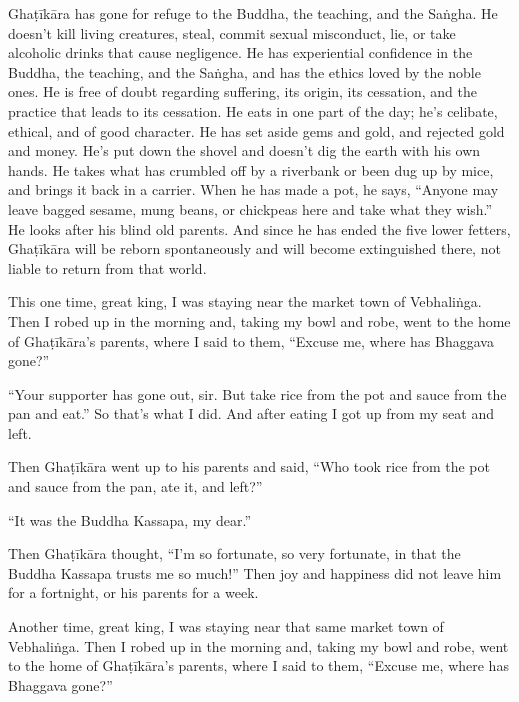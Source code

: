 \documentclass[12pt,openany]{book}%
\begin{document}
\textsanskrit{Ghaṭīkāra} has gone for refuge to the Buddha, the teaching, and the \textsanskrit{Saṅgha}. He doesn’t kill living creatures, steal, commit sexual misconduct, lie, or take alcoholic drinks that cause negligence. He has experiential confidence in the Buddha, the teaching, and the \textsanskrit{Saṅgha}, and has the ethics loved by the noble ones. He is free of doubt regarding suffering, its origin, its cessation, and the practice that leads to its cessation. He eats in one part of the day; he’s celibate, ethical, and of good character. He has set aside gems and gold, and rejected gold and money. He’s put down the shovel and doesn’t dig the earth with his own hands. He takes what has crumbled off by a riverbank or been dug up by mice, and brings it back in a carrier. When he has made a pot, he says, “Anyone may leave bagged sesame, mung beans, or chickpeas here and take what they wish.” He looks after his blind old parents. And since he has ended the five lower fetters, \textsanskrit{Ghaṭīkāra} will be reborn spontaneously and will become extinguished there, not liable to return from that world. 

This one time, great king, I was staying near the market town of \textsanskrit{Vebhaliṅga}. Then I robed up in the morning and, taking my bowl and robe, went to the home of \textsanskrit{Ghaṭīkāra}’s parents, where I said to them, “Excuse me, where has Bhaggava gone?” 

“Your supporter has gone out, sir. But take rice from the pot and sauce from the pan and eat.” So that’s what I did. And after eating I got up from my seat and left. 

Then \textsanskrit{Ghaṭīkāra} went up to his parents and said, “Who took rice from the pot and sauce from the pan, ate it, and left?” 

“It was the Buddha Kassapa, my dear.” 

Then \textsanskrit{Ghaṭīkāra} thought, “I’m so fortunate, so very fortunate, in that the Buddha Kassapa trusts me so much!” Then joy and happiness did not leave him for a fortnight, or his parents for a week. 

Another time, great king, I was staying near that same market town of \textsanskrit{Vebhaliṅga}. Then I robed up in the morning and, taking my bowl and robe, went to the home of \textsanskrit{Ghaṭīkāra}’s parents, where I said to them, “Excuse me, where has Bhaggava gone?” 
\end{document}
